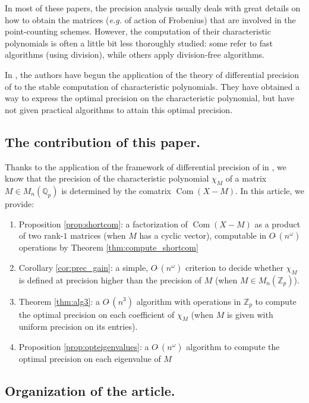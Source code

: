 \documentclass{sig-alternate-05-2015}
\DeclareMathOperator{\com}{Com}
\newcommand{\Z}{\mathbb Z}
\newcommand{\Zp}{\Z_p}
\newcommand{\softO}{O\tilde{~}}
\begin{document}
In most of these papers, the precision analysis usually
deals with great details on how to obtain the matrices (\textit{e.g.} of action of Frobenius)
that are involved in the point-counting schemes.
However, the computation of their characteristic polynomials is often
a little bit less thoroughly studied: some
refer to fast algorithms (using division), while others
apply division-free algorithms.

In \cite{caruso-roe-vaccon:15a}, the authors have begun the application
of the theory of differential precision of \cite{caruso-roe-vaccon:14a}
to the stable computation of characteristic polynomials.
They have obtained a way to express the optimal precision
on the characteristic polynomial, but have not given practical algorithms
to attain this optimal precision.

\subsection*{The contribution of this paper.}

Thanks to the application of the framework of differential precision
of \cite{caruso-roe-vaccon:14a} in \cite{caruso-roe-vaccon:15a},
we know that the precision of the characteristic polynomial
$\chi_M$ of a matrix $M \in M_n(\mathbb{Q}_p)$
is determined by the comatrix $\com(X -M).$
In this article, we provide:
\begin{enumerate}
\renewcommand{\itemsep}{0pt}
\item Proposition \ref{prop:shortcom}: a factorization of $\com(X -M)$
as a product of two rank-$1$ matrices (when $M$ has a cyclic vector),
computable in $\softO(n^\omega)$ operations by Theorem \ref{thm:compute_shortcom}
\item Corollary \ref{cor:prec_gain}: a simple, $\softO(n^\omega)$ criterion
to decide whether $\chi_M$ is defined at precision
higher than the precision of $M$ (when $M \in M_n(\mathbb{Z}_p)$).
\item Theorem \ref{thm:alg3}: a $\softO(n^3)$ algorithm with operations in $\Zp$
to compute the optimal precision on each coefficient of $\chi_M$ (when $M$
is given with uniform precision on its entries).
\item Proposition \ref{prop:opteigenvalues}: a $\softO(n^\omega)$
algorithm to compute the optimal precision on each eigenvalue of $M$
\end{enumerate}


\subsection*{Organization of the article.}
\end{document}
